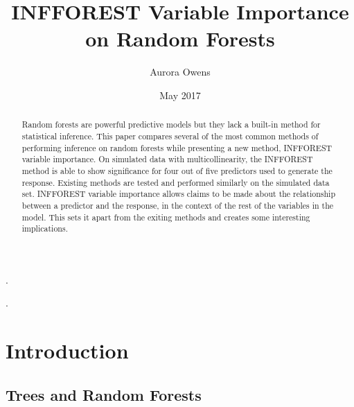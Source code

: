 \documentclass[12pt,twoside]{reedthesis}
\title{INFFOREST Variable Importance on Random Forests}
\author{Aurora Owens}
\date{May 2017}
\begin{document}
      \maketitle
  
  \frontmatter %
  \pagestyle{empty} %

      \begin{acknowledgements}
      .
    \end{acknowledgements}
  
  
      \hypersetup{linkcolor=black}
    \setcounter{tocdepth}{2}
    \tableofcontents
  
      \listoftables
  
      \listoffigures
  
      \begin{abstract}
      Random forests are powerful predictive models but they lack a built-in
      method for statistical inference. This paper compares several of the
      most common methods of performing inference on random forests while
      presenting a new method, INFFOREST variable importance. On simulated
      data with multicollinearity, the INFFOREST method is able to show
      significance for four out of five predictors used to generate the
      response. Existing methods are tested and performed similarly on the
      simulated data set. INFFOREST variable importance allows claims to be
      made about the relationship between a predictor and the response, in the
      context of the rest of the variables in the model. This sets it apart
      from the exiting methods and creates some interesting implications.\par
    \end{abstract}
  
      \begin{dedication}
      .
    \end{dedication}
  
  \mainmatter %
  \pagestyle{fancyplain} %

  \chapter{Introduction}\label{introduction}
  
  \section{Trees and Random Forests}\label{trees-and-random-forests}
  
\end{document}
